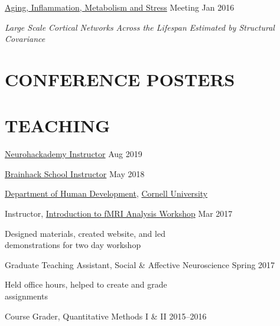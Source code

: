 \documentclass{dupre-cv}
\begin{document}
\href{https://www.libert.cornell.edu/index.php/amm2}{Aging, Inflammation, Metabolism and Stress} Meeting \hfill Jan 2016 \\[0.15cm]
\begin{minipage}{10cm}
\textit{Large Scale Cortical Networks Across the Lifespan      Estimated by Structural Covariance}
\end{minipage}
\vspace{15pt}

\section{CONFERENCE POSTERS}



\section{TEACHING}

\href{https://neurohackademy.org/}{Neurohackademy Instructor} \hfill Aug 2019
\vspace{12pt}

\href{https://brainhackmtl.github.io/school2018/}{Brainhack School Instructor} \hfill May 2018
\vspace{12pt}

\href{http://www.human.cornell.edu/hd/}{Department of Human Development}, \href{https://www.cornell.edu/}{Cornell University}
\begin{outerlist}
 \item[Instructor, \href{https://emdupre.github.io/hd4630_workshops/categories}{Introduction to fMRI Analysis Workshop}] \hfill Mar 2017
  \begin{innerlist}
  \item Designed materials, created website, and led \\  demonstrations for two day workshop
 \end{innerlist}
 
 \item[Graduate Teaching Assistant, Social \& Affective Neuroscience] \hfill Spring 2017
 \begin{innerlist}
  \item Held office hours, helped to create and grade \\ assignments
 \end{innerlist}
 
 \item[Course Grader, Quantitative Methods I \& II] \hfill 2015--2016
\end{outerlist}
\end{document}
